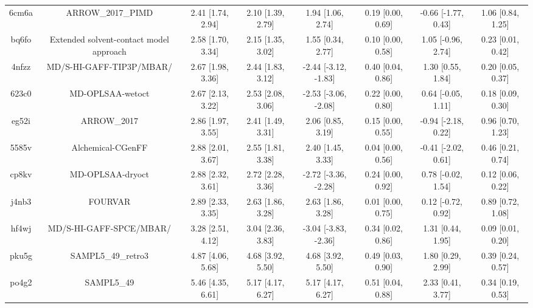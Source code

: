 \documentclass{article}
\begin{document}
\begin{center}
\begin{longtable}{|cccccccc|}
 6cm6a &                                  ARROW\_2017\_PIMD &  2.41 [1.74, 2.94] &  2.10 [1.39, 2.79] &     1.94 [1.06, 2.74] &  0.19 [0.00, 0.69] &  -0.66 [-1.77, 0.43] &     1.06 [0.84, 1.25] \\
 bq6fo &            Extended solvent-contact model approach &  2.58 [1.70, 3.34] &  2.15 [1.35, 3.02] &     1.55 [0.34, 2.77] &  0.10 [0.00, 0.58] &   1.05 [-0.96, 2.74] &     0.23 [0.01, 0.42] \\
 4nfzz &                           MD/S-HI-GAFF-TIP3P/MBAR/ &  2.67 [1.98, 3.36] &  2.44 [1.83, 3.12] &  -2.44 [-3.12, -1.83] &  0.40 [0.04, 0.86] &    1.30 [0.55, 1.84] &     0.20 [0.05, 0.37] \\
 623c0 &                                   MD-OPLSAA-wetoct &  2.67 [2.13, 3.22] &  2.53 [2.08, 3.06] &  -2.53 [-3.06, -2.08] &  0.22 [0.00, 0.80] &   0.64 [-0.05, 1.11] &     0.18 [0.09, 0.30] \\
 eg52i &                                        ARROW\_2017 &  2.86 [1.97, 3.55] &  2.41 [1.49, 3.31] &     2.06 [0.85, 3.19] &  0.15 [0.00, 0.55] &  -0.94 [-2.18, 0.22] &     0.96 [0.70, 1.23] \\
 5585v &                                  Alchemical-CGenFF &  2.88 [2.01, 3.67] &  2.55 [1.81, 3.38] &     2.40 [1.45, 3.33] &  0.04 [0.00, 0.56] &  -0.41 [-2.02, 0.61] &     0.46 [0.21, 0.74] \\
 cp8kv &                                   MD-OPLSAA-dryoct &  2.88 [2.32, 3.61] &  2.72 [2.28, 3.36] &  -2.72 [-3.36, -2.28] &  0.24 [0.00, 0.92] &   0.78 [-0.02, 1.54] &     0.12 [0.06, 0.22] \\
 j4nb3 &                                            FOURVAR &  2.89 [2.33, 3.35] &  2.63 [1.86, 3.28] &     2.63 [1.86, 3.28] &  0.01 [0.00, 0.75] &   0.12 [-0.72, 0.92] &     0.89 [0.72, 1.08] \\
 hf4wj &                            MD/S-HI-GAFF-SPCE/MBAR/ &  3.28 [2.51, 4.12] &  3.04 [2.36, 3.83] &  -3.04 [-3.83, -2.36] &  0.34 [0.02, 0.86] &    1.31 [0.44, 1.95] &     0.09 [0.01, 0.20] \\
 pku5g &                                 SAMPL5\_49\_retro3 &  4.87 [4.06, 5.68] &  4.68 [3.92, 5.50] &     4.68 [3.92, 5.50] &  0.49 [0.03, 0.90] &    1.80 [0.29, 2.99] &     0.39 [0.24, 0.57] \\
 po4g2 &                                         SAMPL5\_49 &  5.46 [4.35, 6.61] &  5.17 [4.17, 6.27] &     5.17 [4.17, 6.27] &  0.51 [0.04, 0.88] &    2.33 [0.41, 3.77] &     0.34 [0.19, 0.53] \\
\end{longtable}
\end{center}
\end{document}
